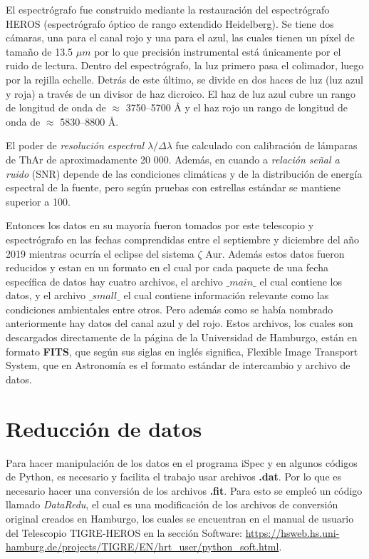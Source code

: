 \documentclass[12pt,oneside,openany,letter]{book}
\begin{document}
\noindent El espectrógrafo fue construido mediante la restauración del espectrógrafo HEROS (espectrógrafo óptico de rango extendido Heidelberg). Se tiene dos cámaras, una para el canal rojo y una para el azul, las cuales tienen un píxel de tamaño de 13.5 $\mu m$ por lo que precisión instrumental está únicamente por el ruido de lectura. Dentro del espectrógrafo, la luz primero pasa el colimador, luego por la rejilla echelle. Detrás de este último, se divide en dos haces de luz (luz azul y roja) a través de un divisor de haz dicroico.  El haz de luz azul cubre un rango de longitud de onda de $\approx$ 3750–5700 \r{A} y el haz rojo un rango de longitud de onda de $\approx$ 5830–8800 \r{A}.

\noindent El poder de \textit{resolución espectral} $\lambda / \Delta \lambda$ fue calculado con calibración de lámparas de ThAr de aproximadamente 20 000. Además, en cuando a \textit{relación señal a ruido} (SNR) depende de las condiciones climáticas y de la distribución de energía espectral de la fuente, pero según pruebas con estrellas estándar se mantiene superior a 100. 

\noindent Entonces los datos en su mayoría fueron tomados por este telescopio y espectrógrafo en las fechas comprendidas entre el septiembre y diciembre del año 2019 mientras ocurría el eclipse del sistema $\zeta$ Aur. Además estos datos fueron reducidos y estan en un formato en el cual por cada paquete de una fecha específica de datos hay cuatro archivos, el archivo $\_ main\_$ el cual contiene los datos, y el archivo $\_ small\_$ el cual contiene información relevante como las condiciones ambientales entre otros. Pero además como se había nombrado anteriormente hay datos del canal azul y del rojo. Estos archivos, los cuales son descargados directamente de la página de la Universidad de Hamburgo, están en formato \textbf{FITS}, que según sus siglas en inglés significa, Flexible Image Transport System, que en Astronomía es el formato estándar \citep{hanisch2001definition} de intercambio y archivo de datos.

\section{Reducción de datos}

Para hacer manipulación de los datos en el programa iSpec y en algunos códigos de Python, es necesario y facilita el trabajo usar archivos \textbf{.dat}. Por lo que es necesario hacer una conversión de los archivos \textbf{.fit}. Para esto se empleó un código llamado \textit{DataRedu}, el cual es una modificación de los archivos de conversión original creados en Hamburgo, los cuales se encuentran en el manual de usuario del Telescopio TIGRE-HEROS en la sección Software: \url{https://hsweb.hs.uni-hamburg.de/projects/TIGRE/EN/hrt_user/python_soft.html}. 
\end{document}
